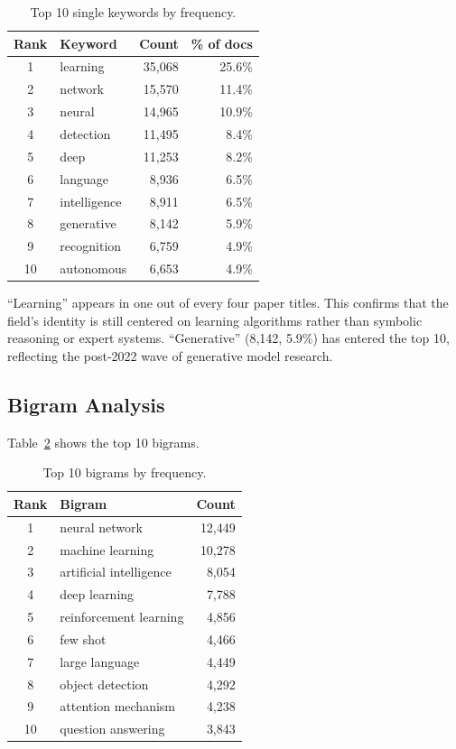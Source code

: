 \documentclass[11pt]{article}
\begin{document}
\begin{table}[h]
\centering
\caption{Top 10 single keywords by frequency.}
\label{tab:keywords}
\begin{tabular}{@{}clrr@{}}
\toprule
Rank & Keyword & Count & \% of docs \\
\midrule
1 & learning & 35,068 & 25.6\% \\
2 & network & 15,570 & 11.4\% \\
3 & neural & 14,965 & 10.9\% \\
4 & detection & 11,495 & 8.4\% \\
5 & deep & 11,253 & 8.2\% \\
6 & language & 8,936 & 6.5\% \\
7 & intelligence & 8,911 & 6.5\% \\
8 & generative & 8,142 & 5.9\% \\
9 & recognition & 6,759 & 4.9\% \\
10 & autonomous & 6,653 & 4.9\% \\
\bottomrule
\end{tabular}
\end{table}

``Learning'' appears in one out of every four paper titles. This confirms that the field's identity is still centered on learning algorithms rather than symbolic reasoning or expert systems. ``Generative'' (8,142, 5.9\%) has entered the top 10, reflecting the post-2022 wave of generative model research.

\subsection{Bigram Analysis}

Table~\ref{tab:bigrams} shows the top 10 bigrams.

\begin{table}[h]
\centering
\caption{Top 10 bigrams by frequency.}
\label{tab:bigrams}
\begin{tabular}{@{}clr@{}}
\toprule
Rank & Bigram & Count \\
\midrule
1 & neural network & 12,449 \\
2 & machine learning & 10,278 \\
3 & artificial intelligence & 8,054 \\
4 & deep learning & 7,788 \\
5 & reinforcement learning & 4,856 \\
6 & few shot & 4,466 \\
7 & large language & 4,449 \\
8 & object detection & 4,292 \\
9 & attention mechanism & 4,238 \\
10 & question answering & 3,843 \\
\bottomrule
\end{tabular}
\end{table}
\end{document}

